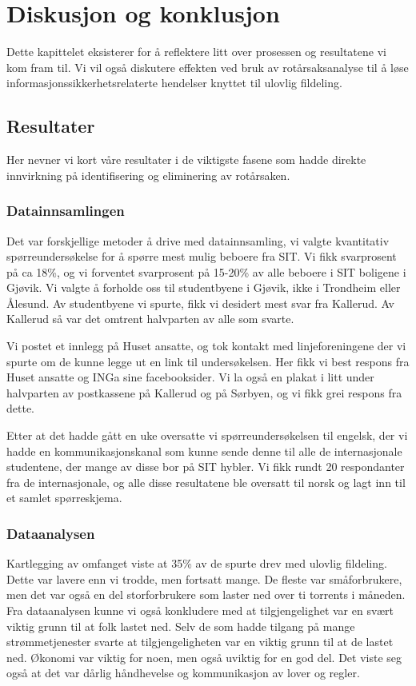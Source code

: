 \chapter{Diskusjon og konklusjon}
Dette kapittelet eksisterer for å reflektere litt over prosessen og resultatene vi kom fram til. Vi vil også diskutere effekten ved bruk av rotårsaksanalyse til å løse informasjonssikkerhetsrelaterte hendelser knyttet til ulovlig fildeling. 

\section{Resultater}
Her nevner vi kort våre resultater i de viktigste fasene som hadde direkte innvirkning på identifisering og eliminering av rotårsaken. 

\subsection{Datainnsamlingen}
Det var forskjellige metoder å drive med datainnsamling, vi valgte kvantitativ spørreundersøkelse for å spørre mest mulig beboere fra SIT. Vi fikk svarprosent på ca 18\%, og vi forventet svarprosent på 15-20\% av alle beboere i SIT boligene i Gjøvik. Vi valgte å forholde oss til studentbyene i Gjøvik, ikke i Trondheim eller Ålesund. Av studentbyene vi spurte, fikk vi desidert mest svar fra Kallerud. Av Kallerud så var det omtrent halvparten av alle som svarte. 

Vi postet et innlegg på Huset ansatte, og tok kontakt med linjeforeningene der vi spurte om de kunne legge ut en link til undersøkelsen. Her fikk vi best respons fra Huset ansatte og INGa sine facebooksider. Vi la også en plakat i litt under halvparten av postkassene på Kallerud og på Sørbyen, og vi fikk grei respons fra dette.

Etter at det hadde gått en uke oversatte vi spørreundersøkelsen til engelsk, der vi hadde en kommunikasjonskanal som kunne sende denne til alle de internasjonale studentene, der mange av disse bor på SIT hybler. Vi fikk rundt 20 respondanter fra de internasjonale, og alle disse resultatene ble oversatt til norsk og lagt inn til et samlet spørreskjema.


\subsection{Dataanalysen}
Kartlegging av omfanget viste at 35\% av de spurte drev med ulovlig fildeling. Dette var lavere enn vi trodde, men fortsatt mange. De fleste var småforbrukere, men det var også en del storforbrukere som laster ned over ti torrents i måneden. Fra dataanalysen kunne vi også konkludere med at tilgjengelighet var en svært viktig grunn til at folk lastet ned. Selv de som hadde tilgang på mange strømmetjenester svarte at tilgjengeligheten var en viktig grunn til at de lastet ned. Økonomi var viktig for noen, men også uviktig for en god del. Det viste seg også at det var dårlig håndhevelse og kommunikasjon av lover og regler. 

